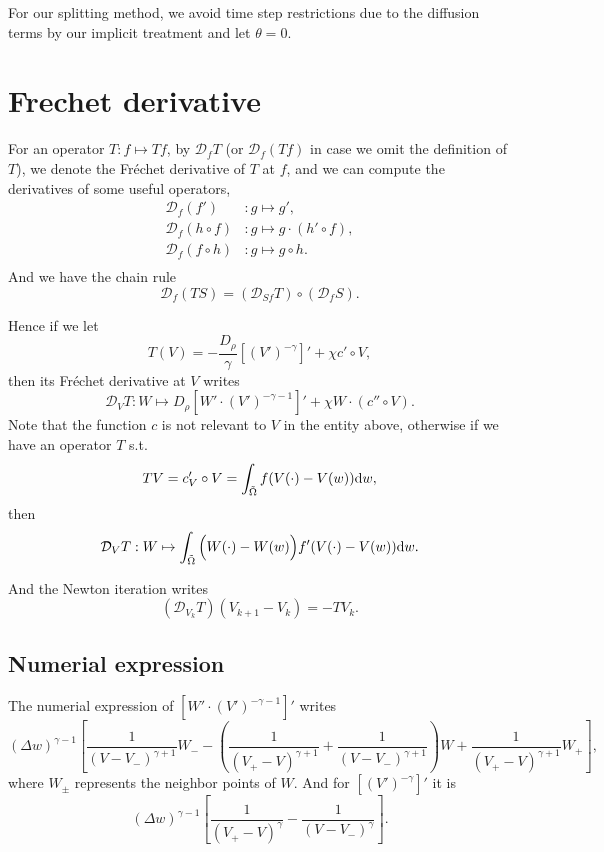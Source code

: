 \documentclass{article}
\newcommand{\frender}{\mathcal D}
\begin{document}
  For our splitting method, we avoid time step restrictions due to the diffusion terms by our
  implicit treatment and let $\theta = 0$.

  \section{Frechet derivative}
  For an operator $T: f\mapsto Tf$, by $\frender_fT$ (or $\frender_f(Tf)$ in case we omit the definition
  of $T$), we denote the Fr\'echet derivative
  of $T$ at $f$, and we can compute the derivatives of some useful operators, 
  \[
    \begin{aligned}
      \frender_f(f')      &:g\mapsto g', \\
      \frender_f(h\circ f)&:g\mapsto g\cdot(h'\circ f), \\
      \frender_f(f\circ h)&:g\mapsto g\circ h. \\
    \end{aligned}
  \]
  And we have the chain rule
  \[
    \frender_f(TS) = \left(\frender_{Sf}T\right) \circ \left(\frender_fS\right).
  \]

  Hence if we let
  \[
    T(V) = -\frac{D_\rho}{\gamma}\left[(V')^{-\gamma}\right]'
    + \chi c'\circ V,
  \]
  then its Fr\'echet derivative at $V$ writes
  \[
    \frender_V T: W\mapsto
    D_\rho\left[W'\cdot (V')^{-\gamma - 1}\right]' + \chi W\cdot(c''\circ V).
  \]
  Note that the function $c$ is not relevant to $V$ in the entity above,
  otherwise if we have an operator $T$ s.t.
  \[
    TV = c_V'\circ V = \int_{\tilde\Omega} f(V(\cdot) - V(w))\mathrm d w,
  \]
  then
  \[
    \frender_VT:W \mapsto \int_{\tilde\Omega}\Big(W(\cdot) - W(w)\Big)f'(V(\cdot) - V(w))\diff w.
  \]

  And the Newton iteration writes
  \[
    (\frender_{V_k} T)(V_{k + 1} - V_k) = - TV_k.
  \]

  \subsection{Numerial expression}
  The numerial expression of $[W'\cdot(V')^{-\gamma - 1}]'$ writes
  \[
    (\Delta w)^{\gamma - 1}
    \left[
      \frac{1}{(V - V_-)^{\gamma + 1}}W_-
      -\left(\frac{1}{(V_+ - V)^{\gamma + 1}} + \frac{1}{(V - V_-)^{\gamma + 1}}\right)W
      +\frac{1}{(V_+ - V)^{\gamma + 1}}W_+
    \right],
  \]
  where $W_{\pm}$ represents the neighbor points of $W$.
  And for $[(V')^{-\gamma}]'$ it is
  \[
    (\Delta w)^{\gamma - 1}
    \left[
      \frac1{(V_+ - V)^{\gamma}} - \frac1{(V - V_-)^\gamma}
    \right].
  \]
\end{document}
